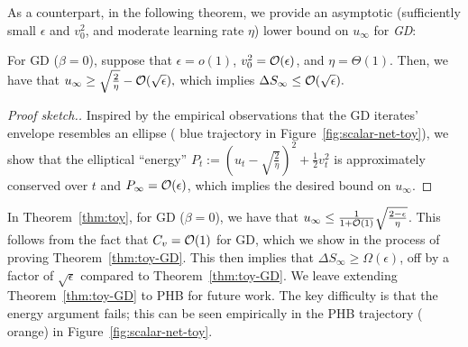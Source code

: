 As a counterpart, in the following theorem, we provide an asymptotic (sufficiently small $\epsilon$ and $v_0^2$, and moderate learning rate $\eta$) lower bound on $u_\infty$ for {\it GD}:
\begin{theorem}[Informal]
\label{thm:toy-GD}
    For GD ($\beta = 0$), suppose that $\epsilon = o(1)$, $v_0^2 = {\mathcal{O}}(\epsilon)$, and $\eta = \Theta(1)$.
    Then, we have that 
    $u_\infty \geq \sqrt{\frac{2}{\eta}} - {\mathcal{O}}( \sqrt{\epsilon} ),$ which implies $\Delta S_\infty \leq {\mathcal{O}}(\sqrt{\epsilon}).$
\end{theorem}
\begin{proof}[Proof sketch.]
    Inspired by the empirical observations that the GD iterates' envelope resembles an ellipse ({\color{blue} blue} trajectory in Figure~\ref{fig:scalar-net-toy}), we show that the elliptical ``energy'' $P_t := \left( u_t - \sqrt{\frac{2}{\eta}} \right)^2 + \frac{1}{2}v_t^2$ is approximately conserved over $t$ and $P_\infty = {\mathcal{O}}(\epsilon)$, which implies the desired bound on $u_\infty$.
\end{proof}


In Theorem~\ref{thm:toy}, for GD ($\beta = 0$), we have that $u_\infty \leq \frac{1}{1 + {\mathcal{O}}(1)} \sqrt{\frac{2 - \epsilon}{\eta}}$.
This follows from the fact that $C_v = {\mathcal{O}}(1)$ for GD, which we show in the process of proving Theorem~\ref{thm:toy-GD}.
This then implies that $\Delta S_\infty \geq \Omega(\epsilon)$, off by a factor of $\sqrt{\epsilon}$ compared to Theorem~\ref{thm:toy-GD}.
We leave extending Theorem~\ref{thm:toy-GD} to PHB for future work. The key difficulty is that the energy argument fails; this can be seen empirically in the PHB trajectory ({\color{orange} orange}) in Figure~\ref{fig:scalar-net-toy}.


